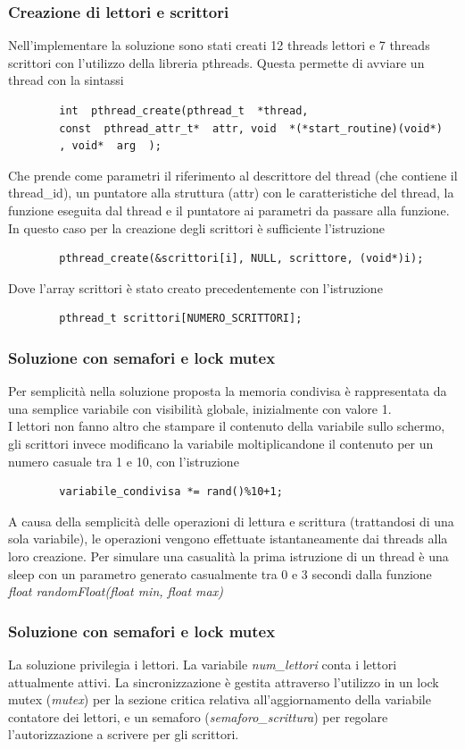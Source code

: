 \documentclass{beamer}[10pt]
\begin{document}
\begin{frame}[fragile]
	\frametitle{Creazione di lettori e scrittori}
	Nell'implementare la soluzione sono stati creati 12 threads lettori e 7 threads scrittori con l'utilizzo della libreria pthreads. Questa permette di avviare un thread con la sintassi
	\begin{verbatim}
		int  pthread_create(pthread_t  *thread,
		const  pthread_attr_t*  attr, void  *(*start_routine)(void*)
		, void*  arg  );
	\end{verbatim}
	Che prende come parametri il riferimento al descrittore del thread (che contiene il thread\_id), un puntatore alla struttura (attr) con le caratteristiche del thread, la funzione eseguita dal thread e il puntatore ai parametri da passare alla funzione.
	\\In questo caso per la creazione degli scrittori è sufficiente l'istruzione 
	\begin{verbatim}
		pthread_create(&scrittori[i], NULL, scrittore, (void*)i);
	\end{verbatim}
	Dove l'array scrittori è stato creato precedentemente con l'istruzione
	\begin{verbatim}
		pthread_t scrittori[NUMERO_SCRITTORI];
	\end{verbatim}
\end{frame}

\begin{frame}[fragile]
	\frametitle{Soluzione con semafori e lock mutex}
	Per semplicità nella soluzione proposta la memoria condivisa è rappresentata da una semplice variabile con visibilità globale, inizialmente con valore 1.
	\\I lettori non fanno altro che stampare il contenuto della variabile sullo schermo, gli scrittori invece modificano la variabile moltiplicandone il contenuto per un numero casuale tra 1 e 10, con l'istruzione
	\begin{verbatim}
		variabile_condivisa *= rand()%10+1;
	\end{verbatim}
	A causa della semplicità delle operazioni di lettura e scrittura (trattandosi di una sola variabile), le operazioni vengono effettuate istantaneamente dai threads alla loro creazione. Per simulare una casualità la prima istruzione di un thread è una sleep con un parametro generato casualmente tra 0 e 3 secondi dalla funzione \emph{float randomFloat(float min, float max)}
\end{frame}

\begin{frame}[fragile]
	\frametitle{Soluzione con semafori e lock mutex}
	La soluzione privilegia i lettori.
	La variabile \emph{num\_lettori} conta i lettori attualmente attivi. La sincronizzazione è gestita attraverso l'utilizzo in un lock mutex (\emph{mutex}) per la sezione critica relativa all'aggiornamento della variabile contatore dei lettori, e un semaforo (\emph{semaforo\_scrittura}) per regolare l'autorizzazione a scrivere per gli scrittori.
\end{frame}
	
\end{document}

